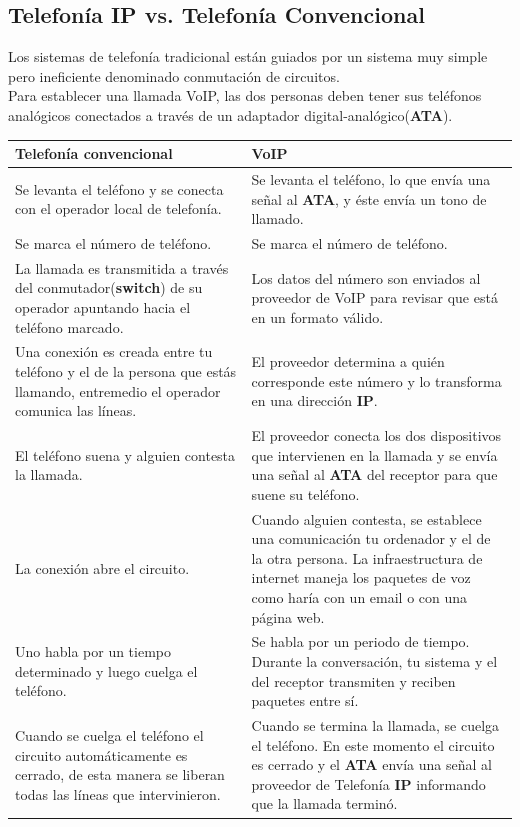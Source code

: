 \documentclass[a4paper, 11pt]{article} %
\begin{document}
	\subsection{Telefonía IP vs. Telefonía Convencional}
		Los sistemas de telefonía tradicional están guiados por un sistema muy simple pero ineficiente denominado conmutación de circuitos.\\
		Para establecer una llamada VoIP, las dos personas deben tener sus teléfonos analógicos conectados a través de un adaptador digital-analógico(\textbf{ATA}).\\
		\begin{tabular}{|p{6cm}|p{6cm}|}
			\hline
			Telefonía convencional & VoIP \\
			\hline \hline
			Se levanta el teléfono y se conecta con el operador local de telefonía. & Se levanta el teléfono, lo que envía una señal al \textbf{ATA}, y éste envía un tono de llamado. \\
			\hline
			Se marca el número de teléfono. & Se marca el número de teléfono. \\
			\hline
			La llamada es transmitida a través del conmutador(\textbf{switch}) de su operador apuntando hacia el teléfono marcado. & Los datos del número son enviados al proveedor de VoIP para revisar que está en un formato válido. \\
			\hline
			Una conexión es creada entre tu teléfono y el de la persona que estás llamando, entremedio el operador comunica las líneas. & El proveedor determina a quién corresponde este número y lo transforma en una dirección \textbf{IP}. \\
			\hline
			El teléfono suena y alguien contesta la llamada. & El proveedor conecta los dos dispositivos que intervienen en la llamada y se envía una señal al \textbf{ATA} del receptor para que suene su teléfono. \\
			\hline
			La conexión abre el circuito. & Cuando alguien contesta, se establece una comunicación tu ordenador y el de la otra persona. La infraestructura de internet maneja los paquetes de voz como haría con un email o con una página web. \\
			\hline
			Uno habla por un tiempo determinado y luego cuelga el teléfono. & Se habla por un periodo de tiempo. Durante la conversación, tu sistema y el del receptor transmiten y reciben paquetes entre sí. \\
			\hline
			Cuando se cuelga el teléfono el circuito automáticamente es cerrado, de esta manera se liberan todas las líneas que intervinieron. & Cuando se termina la llamada, se cuelga el teléfono. En este momento el circuito es cerrado y el \textbf{ATA} envía una señal al proveedor de Telefonía \textbf{IP} informando que la llamada terminó. \\
			\hline
		\end{tabular}
		\label{tabla:vs}
		
\end{document}
